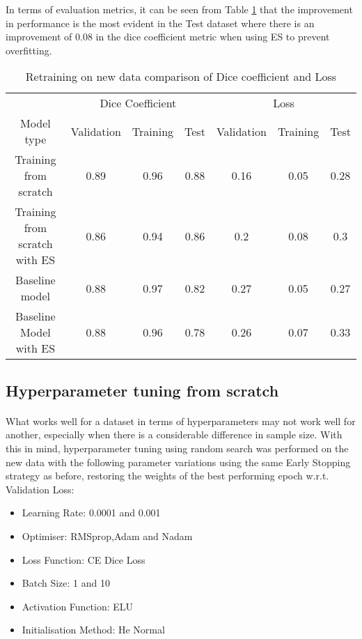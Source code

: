 In terms of evaluation metrics, it can be seen from Table \ref{tab_fs} that the improvement in performance is the most evident in the Test dataset where there is an improvement of $0.08$ in the dice coefficient metric when using \gls{ES} to prevent overfitting.

\begin{table}[ht] 
    \begin{center}
    \begin{tabular}{ccccccc} 
    \toprule
       & \multicolumn{3}{c}{Dice Coefficient}     & \multicolumn{3}{c}{Loss} \\
    Model type & Validation & Training & Test & Validation    & Training    & Test   \\ \midrule
    \rowcolor{lightgray}
    Training from scratch & 0.89 & 0.96 & 0.88 & 0.16 & 0.05 & 0.28  \\ Training from scratch with ES & 0.86 & 0.94 & 0.86 & 0.2 & 0.08 & 0.3  \\ Baseline model & 0.88 & 0.97 & 0.82 & 0.27 & 0.05 & 0.27  \\ Baseline Model with ES & 0.88 & 0.96 & 0.78 & 0.26 & 0.07 & 0.33  \\
    \bottomrule
    \end{tabular}
  \end{center} 
  \caption{Retraining on new data comparison of Dice coefficient and Loss}\label{tab_fs}
\end{table}

\subsection{Hyperparameter tuning from scratch} \label{hp_new_data}
\paragraph{}
What works well for a dataset in terms of hyperparameters may not work well for another, especially when there is a considerable difference in sample size. With this in mind, hyperparameter tuning using random search was performed on the new data with the following parameter variations using the same Early Stopping strategy as before, restoring the weights of the best performing epoch \gls{w.r.t.} Validation Loss:

\begin{itemize}
    \item{Learning Rate: 0.0001 and 0.001}
    \item{Optimiser: RMSprop,Adam and Nadam}
    \item{Loss Function: CE Dice Loss}
    \item{Batch Size: 1 and 10}
    \item{Activation Function: ELU}
    \item{Initialisation Method: He Normal}
\end{itemize}
